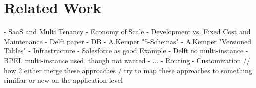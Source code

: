 \section{Related Work}

- SaaS and Multi Tenancy
  - Economy of Scale
    - Development vs. Fixed Cost and Maintenance
    - Delft paper
- DB
  - A.Kemper "5-Schemas"
  - A.Kemper "Versioned Tables"
- Infrastructure
  - Salesforce as good Example
  - Delft no multi-instance
  - BPEL multi-instance used, though not wanted
- ...
  - Routing
  - Customization // how 2 either merge these approaches / try to map these approaches to something similiar or new on the application level
